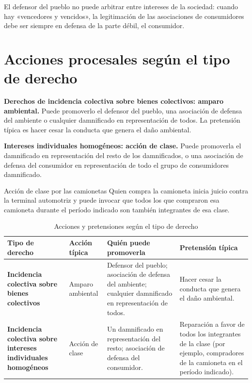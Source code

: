 \documentclass[12pt,oneside]{book}
\begin{document}
\begin{important}
El defensor del pueblo no puede arbitrar entre intereses de la sociedad: cuando hay «vencedores y vencidos», la legitimación de las asociaciones de consumidores debe ser siempre en defensa de la parte débil, el consumidor.
\end{important}

\section{Acciones procesales según el tipo de derecho}

\textbf{Derechos de incidencia colectiva sobre bienes colectivos: amparo ambiental.} Puede promoverlo el defensor del pueblo, una asociación de defensa del ambiente o cualquier damnificado en representación de todos. La pretensión típica es hacer cesar la conducta que genera el daño ambiental.

\textbf{Intereses individuales homogéneos: acción de clase.} Puede promoverla el damnificado en representación del resto de los damnificados, o una asociación de defensa del consumidor en representación de todo el grupo de consumidores damnificado.

\begin{example}{Acción de clase por las camionetas}
Quien compra la camioneta inicia juicio contra la terminal automotriz y puede invocar que todos los que compraron esa camioneta durante el período indicado son también integrantes de esa clase.
\end{example}

\begin{table}[H]
\centering
\small
\caption{Acciones y pretensiones según el tipo de derecho}
\begin{tabularx}{\textwidth}{>{\raggedright\arraybackslash\bfseries}p{3.1cm} >{\raggedright\arraybackslash}p{2.2cm} >{\raggedright\arraybackslash}X >{\raggedright\arraybackslash}X}
\toprule
Tipo de derecho & Acción típica & Quién puede promoverla & Pretensión típica \\
\midrule
Incidencia colectiva sobre bienes colectivos & Amparo ambiental & Defensor del pueblo; asociación de defensa del ambiente; cualquier damnificado en representación de todos. & Hacer cesar la conducta que genera el daño ambiental. \\
Incidencia colectiva sobre intereses individuales homogéneos & Acción de clase & Un damnificado en representación del resto; asociación de defensa del consumidor. & Reparación a favor de todos los integrantes de la clase (por ejemplo, compradores de la camioneta en el período indicado). \\
\bottomrule
\end{tabularx}
\end{table}
\end{document}

